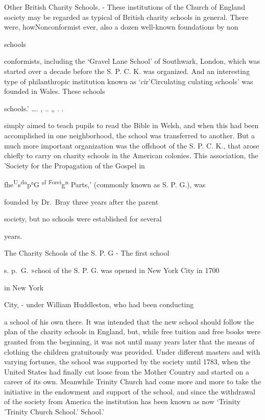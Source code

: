 \documentclass[
]{book}
\begin{document}
Other British Charity Schools. - These institutions of the Church of England society may be regarded as typical of British charity schools in general. There were, how\protect\hypertarget{ch20.xmlux5cux23para.293.1.0.box.78.236.1269.43.q.60}{}{Nonconformist ever, also a dozen well-known foundations by non}

schools

conformists, including the `Gravel Lane School' of Southwark, London, which was started over a decade before the S. P. C. K. was organized. And an interesting type of philanthropic institution known as `cir'Circulating culating schools' was founded in Wales. These schools

schools.' \ldots. , .. „ . .

simply aimed to teach pupils to read the Bible in Welsh, and when this had been accomplished in one neighborhood, the school was transferred to another. But a much more important organization was the offshoot of the S. P. C. K., that arose chiefly to carry on charity schools in the American colonies. This association, the 'Society for the Propagation of the Gospel in

fhe\textsuperscript{U}s\textsuperscript{da}p°G °\textsuperscript{f} \textsuperscript{Forei}g\textsuperscript{n} Parts,' (commonly known as S. P. G.), was

founded by Dr.~Bray three years after the parent

society, but no schools were established for several

years.

The Charity Schools of the S. P. G - The first school

s. p.~\textsc{G. }»chooi of the S. P. G. was opened in New York City in 1700

in New York

City, - under William Huddleston, who had been conducting

a school of his own there. It was intended that the new school should follow the plan of the charity schools in England, but, while free tuition and free books were granted from the beginning, it was not until many years later that the means of clothing the children gratuitously was provided. Under different masters and with varying fortunes, the school was supported by the society until 1783, when the United States had finally cut loose from the Mother Country and started on a career of its own. Meanwhile Trinity Church had come more and more to take the initiative in the endowment and support of the school, and since the withdrawal of the\protect\hypertarget{ch20.xmlux5cux23para.294.1.0.box.132.220.1232.98.q.60}{}{ society from America the institution has been known as now `Trinity 'Trinity Church School.' School.'}
\end{document}
